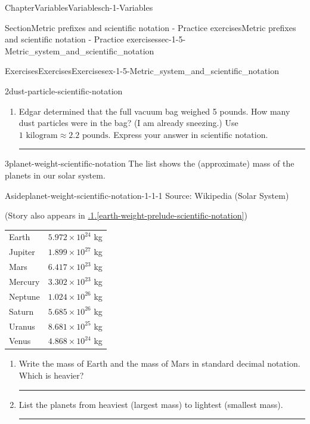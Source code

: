 \documentclass[twoside,11pt,]{book}
\newcommand{\tabularfont}{\relax}
\newcommand{\xreffont}{\relax}
\newlength{\workspacestrutwidth}
\numberwithin{equation}{section}
\begin{document}
\begin{chapterptx}{Chapter}{Variables}{}{Variables}{}{}{ch-1-Variables}
\begin{sectionptx}{Section}{Metric prefixes and scientific notation - Practice exercises}{}{Metric prefixes and scientific notation - Practice exercises}{}{}{sec-1-5-Metric_system_and_scientific_notation}
\begin{exercises-subsection-numberless}{Exercises}{Exercises}{}{Exercises}{}{}{ex-1-5-Metric_system_and_scientific_notation}
\begin{divisionexercise}{2}{}{}{dust-particle-scientific-notation}
\begin{enumerate}[label=(\alph*),ref=\alph*]
\begin{enumerate}[label=\roman*.,ref=\theenumi.\roman*]
\par\rule{\workspacestrutwidth}{1cm}%
\item{}micrograms (\(\mu\)g)%
\par\rule{\workspacestrutwidth}{1cm}%
\item{}nanograms (ng)%
\par\rule{\workspacestrutwidth}{1cm}%
\end{enumerate}%
\item{}Edgar determined that the full vacuum bag weighed 5 pounds. How many dust particles were in the bag? (I am already sneezing.) Use \(1 \text{ kilogram} \approx 2.2 \text{ pounds}\). Express your answer in scientific notation.%
\par\rule{\workspacestrutwidth}{1cm}%
\end{enumerate}%
\end{divisionexercise}%
\clearpage
\begin{divisionexercise}{3}{}{}{planet-weight-scientific-notation}%
The list shows the (approximate) mass of the planets in our solar system. \begin{aside}{Aside}{}{planet-weight-scientific-notation-1-1-1}%
Source: Wikipedia (Solar System)%
\par
(Story also appears in \hyperref[earth-weight-prelude-scientific-notation]{{\xreffont 0.8.1}.{\xreffont\ref{earth-weight-prelude-scientific-notation}}})%
\end{aside}
%
 \begin{center}%
{\tabularfont%
\begin{tabular}{ll}
Earth&\(5.972 \times 10^{24}\) kg\tabularnewline[0pt]
Jupiter&\(1.899 \times 10^{27}\) kg\tabularnewline[0pt]
Mars&\(6.417 \times 10^{23}\) kg\tabularnewline[0pt]
Mercury&\(3.302 \times 10^{23}\) kg\tabularnewline[0pt]
Neptune&\(1.024 \times 10^{26}\) kg\tabularnewline[0pt]
Saturn&\(5.685 \times 10^{26}\) kg\tabularnewline[0pt]
Uranus&\(8.681 \times 10^{25}\) kg\tabularnewline[0pt]
Venus&\(4.868 \times 10^{24}\) kg
\end{tabular}
}%
\end{center}%
\begin{enumerate}[label=(\alph*),ref=\alph*]%
\item{}Write the mass of Earth and the mass of Mars in standard decimal notation. Which is heavier?%
\par\rule{\workspacestrutwidth}{1.25in}%
\item{}List the planets from heaviest (largest mass) to lightest (smallest mass).%
\par\rule{\workspacestrutwidth}{1.25in}%

\end{enumerate}
\end{divisionexercise}
\end{exercises-subsection-numberless}
\end{sectionptx}
\end{chapterptx}
\end{document}
